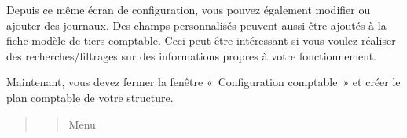 \documentclass[a4paper,10pt,oneside,french]{sphinxmanual}
\begin{document}
\sphinxAtStartPar
Depuis ce même écran de configuration, vous pouvez également modifier ou ajouter des journaux. Des champs personnalisés peuvent aussi être ajoutés à la fiche modèle de tiers comptable. Ceci peut être intéressant si vous voulez réaliser des recherches/filtrages sur des informations propres à votre fonctionnement.

\sphinxAtStartPar
Maintenant, vous devez fermer la fenêtre « Configuration comptable » et créer le plan comptable de votre structure.
\begin{quote}
\begin{quote}

\sphinxAtStartPar
Menu 
\end{quote}
\end{quote}
\end{document}
